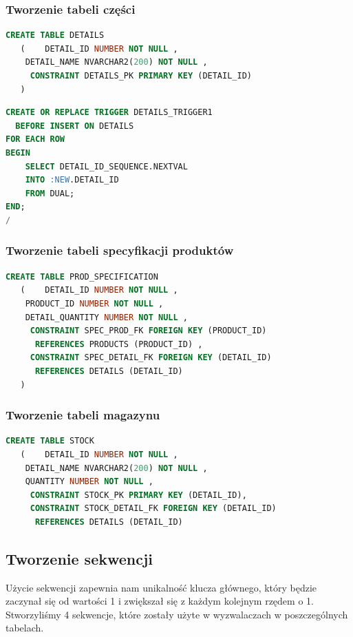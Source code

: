 \documentclass{article}
\begin{document}
\subsubsection{Tworzenie tabeli części}
\begin{lstlisting}[language=SQL,frame=single]
   CREATE TABLE DETAILS 
   (	DETAIL_ID NUMBER NOT NULL , 
	DETAIL_NAME NVARCHAR2(200) NOT NULL , 
	 CONSTRAINT DETAILS_PK PRIMARY KEY (DETAIL_ID)
   )
\end{lstlisting}
\begin{lstlisting}[language=SQL,frame=single]
  CREATE OR REPLACE TRIGGER DETAILS_TRIGGER1 
  BEFORE INSERT ON DETAILS
FOR EACH ROW
BEGIN
	SELECT DETAIL_ID_SEQUENCE.NEXTVAL
	INTO :NEW.DETAIL_ID
	FROM DUAL;
END;
/
\end{lstlisting}

\newpage
\subsubsection{Tworzenie tabeli specyfikacji produktów}
\begin{lstlisting}[language=SQL,frame=single]
  CREATE TABLE PROD_SPECIFICATION 
   (	DETAIL_ID NUMBER NOT NULL , 
	PRODUCT_ID NUMBER NOT NULL , 
	DETAIL_QUANTITY NUMBER NOT NULL , 
	 CONSTRAINT SPEC_PROD_FK FOREIGN KEY (PRODUCT_ID)
	  REFERENCES PRODUCTS (PRODUCT_ID) , 
	 CONSTRAINT SPEC_DETAIL_FK FOREIGN KEY (DETAIL_ID)
	  REFERENCES DETAILS (DETAIL_ID) 
   ) 
\end{lstlisting}

\subsubsection{Tworzenie tabeli magazynu}
\begin{lstlisting}[language=SQL,frame=single]
  CREATE TABLE STOCK 
   (	DETAIL_ID NUMBER NOT NULL , 
	DETAIL_NAME NVARCHAR2(200) NOT NULL , 
	QUANTITY NUMBER NOT NULL , 
	 CONSTRAINT STOCK_PK PRIMARY KEY (DETAIL_ID), 
	 CONSTRAINT STOCK_DETAIL_FK FOREIGN KEY (DETAIL_ID)
	  REFERENCES DETAILS (DETAIL_ID)
\end{lstlisting}

\subsection{Tworzenie sekwencji}

Użycie sekwencji zapewnia nam unikalność klucza głównego, który będzie zaczynał
się od wartości 1 i zwiększał się z każdym kolejnym rzędem o 1. Stworzyliśmy 4
sekwencje, które zostały użyte w wyzwalaczach w poszczególnych tabelach.
\end{document}
